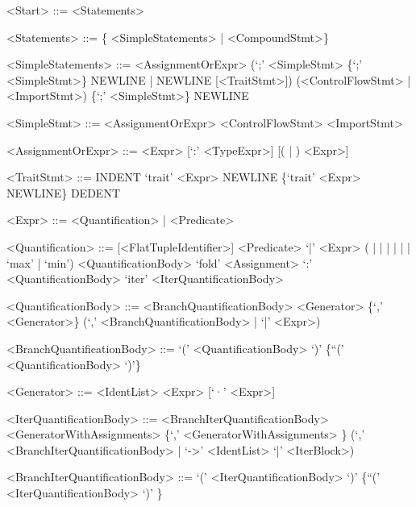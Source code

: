 \documentclass{article}
\begin{document}
\begin{grammar}
<Start> ::= <Statements>

<Statements> ::= \{ <SimpleStatements> | <CompoundStmt>\}

<SimpleStatements> ::= <AssignmentOrExpr> (`;' <SimpleStmt> \{`;' <SimpleStmt>\} NEWLINE | NEWLINE [<TraitStmt>])
    \alt (<ControlFlowStmt> | <ImportStmt>) \{`;' <SimpleStmt>\} NEWLINE

<SimpleStmt> ::= <AssignmentOrExpr>
    \alt <ControlFlowStmt>
    \alt <ImportStmt>

<AssignmentOrExpr> ::= <Expr> [`:' <TypeExpr>] [(\lit{$\coloneqq$} | \lit{$:\in$}) <Expr>]

<TraitStmt> ::= INDENT `trait' <Expr> NEWLINE \{`trait' <Expr> NEWLINE\} DEDENT

<Expr> ::= <Quantification> | <Predicate>

<Quantification> ::= \lit{$\lambda$} [<FlatTupleIdentifier>] \lit{$\cdot$} <Predicate> `|' <Expr>
    \alt (\lit{$\sum$} | \lit{$\prod$} | \lit{$\bigcup$} | \lit{$\bigcap$} | \lit{$\exists$} | \lit{$\forall$} | `max' | `min') <QuantificationBody>
    \alt `fold' <Assignment> `:' <QuantificationBody>
    \alt `iter' <IterQuantificationBody>

<QuantificationBody> ::= <BranchQuantificationBody>
    \alt <Generator> \{`,' <Generator>\} (`,' <BranchQuantificationBody> | `|' <Expr>)

<BranchQuantificationBody> ::= `(' <QuantificationBody> `)' \{``(' <QuantificationBody> `)'\}

<Generator> ::= <IdentList> \lit{$\in$} <Expr> [`·' <Expr>]

<IterQuantificationBody> ::= <BranchIterQuantificationBody>
    \alt <GeneratorWithAssignments> \{`,' <GeneratorWithAssignments> \} (`,' <BranchIterQuantificationBody> | `->' <IdentList> `|' <IterBlock>)

<BranchIterQuantificationBody> ::= `(' <IterQuantificationBody> `)' \{``(' <IterQuantificationBody> `)' \}


\end{grammar}
\end{document}
